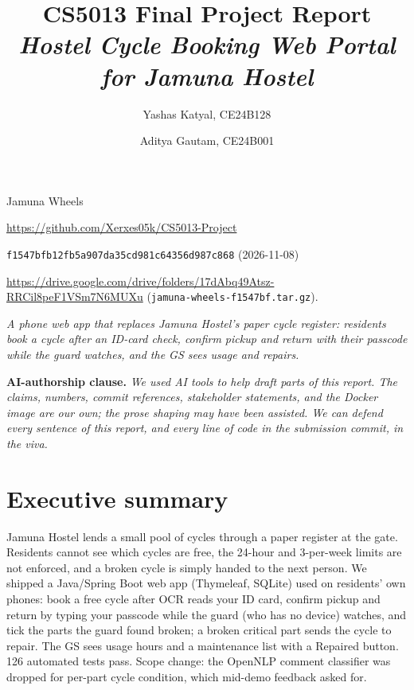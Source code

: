 \documentclass[11pt,a4paper]{article}
\title{CS5013 Final Project Report \\
       \large\textit{Hostel Cycle Booking Web Portal for Jamuna Hostel}}
\author{Yashas Katyal, CE24B128 \and Aditya Gautam, CE24B001}
\date{}
\begin{document}
\maketitle

\vspace{-2.0em}

\begin{description}[leftmargin=!,labelwidth=\widthof{\textbf{Submission commit:}},nosep,font=\bfseries]
  \item[Team Name:]         Jamuna Wheels
  \item[Repository:]      \url{https://github.com/Xerxes05k/CS5013-Project}
  \item[Submission commit:] \texttt{f1547bfb12fb5a907da35cd981c64356d987c868} (2026-11-08)
  \item[Docker image:]    \url{https://drive.google.com/drive/folders/17dAbq49Atsz-RRCil8peF1VSm7N6MUXu} (\texttt{jamuna-wheels-f1547bf.tar.gz}).
  \item[Tagline:]         \textit{A phone web app that replaces Jamuna Hostel's paper cycle register: residents book a cycle after an ID-card check, confirm pickup and return with their passcode while the guard watches, and the GS sees usage and repairs.}
\end{description}

\textbf{AI-authorship clause.}
\textit{%
We used AI tools to help draft parts of this report.  The claims,
numbers, commit references, stakeholder statements, and the Docker
image are our own; the prose shaping may have been assisted.  We can
defend every sentence of this report, and every line of code in the
submission commit, in the viva.%
}

\section{Executive summary}

Jamuna Hostel lends a small pool of cycles through a paper register at the gate. Residents cannot see which cycles are free, the 24-hour and 3-per-week limits are not enforced, and a broken cycle is simply handed to the next person. We shipped a Java/Spring Boot web app (Thymeleaf, SQLite) used on residents' own phones: book a free cycle after OCR reads your ID card, confirm pickup and return by typing your passcode while the guard (who has no device) watches, and tick the parts the guard found broken; a broken critical part sends the cycle to repair. The GS sees usage hours and a maintenance list with a Repaired button. 126 automated tests pass. Scope change: the OpenNLP comment classifier was dropped for per-part cycle condition, which mid-demo feedback asked for.
\end{document}
